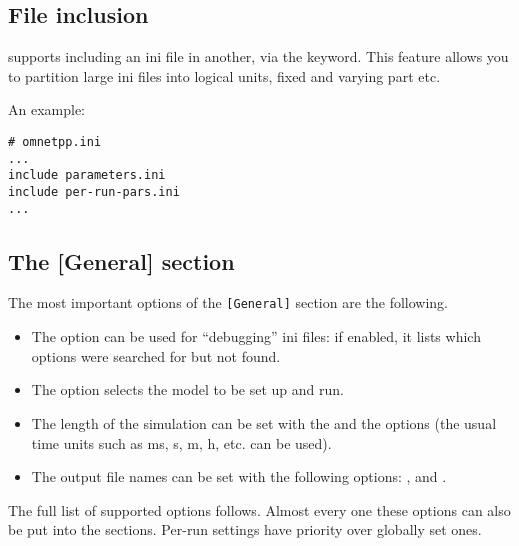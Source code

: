 \subsection{File inclusion}

{\opp} supports including an ini file in another,
via the  keyword. This feature allows you to partition large ini
files into logical units, fixed and varying part etc.

An example:

\begin{verbatim}
# omnetpp.ini
...
include parameters.ini
include per-run-pars.ini
...
\end{verbatim}


\subsection{The [General] section}
\label{sec:ch-run-sim:general-section}

The most important options of the \texttt{[General]} section are the
following.
\begin{itemize}
  \item{The  option can be used for ``debugging'' ini
    files: if enabled, it lists which options were searched for but
    not found.}
  \item{The  option selects the model to be set up and run.}
  \item{The length of the simulation can be set with the
     and the  options (the
    usual time units such as ms, s, m, h, etc. can be used).}
  \item{The output file names can be set with the following options:
    ,  and .}
\end{itemize}

The full list of supported options follows. Almost every one these options
can also be put into the  sections. Per-run settings
have priority over globally set ones.


